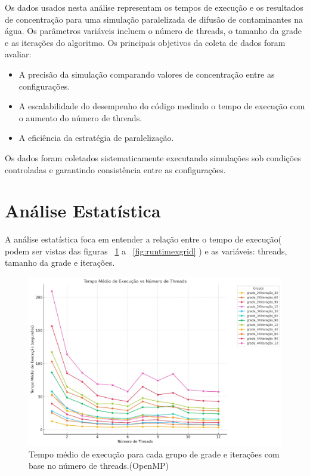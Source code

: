 Os dados usados nesta análise representam os tempos de execução e os resultados de concentração para uma simulação paralelizada de difusão de contaminantes na água. Os parâmetros variáveis incluem o número de threads, o tamanho da grade e as iterações do algoritmo. Os principais objetivos da coleta de dados foram avaliar:

\begin{itemize}
    \item A precisão da simulação comparando valores de concentração entre as configurações.
    \item A escalabilidade do desempenho do código medindo o tempo de execução com o aumento do número de threads.
    \item A eficiência da estratégia de paralelização.
\end{itemize}

Os dados foram coletados sistematicamente executando simulações sob condições controladas e garantindo consistência entre as configurações.

\section{Análise Estatística}
A análise estatística foca em entender a relação entre o tempo de execução( podem ser vistas das figuras ~\ref{fig:executionTime} a ~\ref{fig:runtimexgrid} ) e as variáveis: threads, tamanho da grade e iterações.

\begin{figure}[H]
    \centering
    \includegraphics[width=.95\textwidth]{assets/Tempo de Execução.jpg}
    \caption{Tempo médio de execução para cada grupo de grade e iterações com base no número de threads.(OpenMP)}
    \label{fig:executionTime}
\end{figure}

